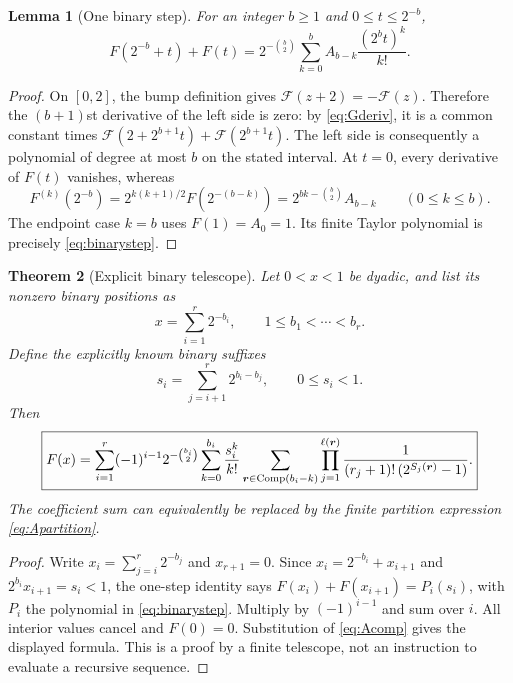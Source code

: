 \documentclass[11pt,oneside]{article}
\newtheorem{theorem}{Theorem}[section]
\newtheorem{lemma}[theorem]{Lemma}
\theoremstyle{definition}\newtheorem{definition}[theorem]{Definition}
\theoremstyle{remark}\newtheorem{remark}[theorem]{Remark}
\newcommand{\G}{\mathcal F}\newcommand{\eps}{\varepsilon}
\begin{document}
\begin{lemma}[One binary step]
\label{lem:binarystep}
For an integer $b\ge1$ and $0\le t\le2^{-b}$,
\begin{equation}
 F(2^{-b}+t)+F(t)
 =2^{-\binom b2}\sum_{k=0}^{b}A_{b-k}\frac{(2^bt)^k}{k!}.
 \label{eq:binarystep}
\end{equation}
\end{lemma}
\begin{proof}
On $[0,2]$, the bump definition gives $\G(z+2)=-\G(z)$. Therefore the
$(b+1)$st derivative of the left side is zero: by \eqref{eq:Gderiv}, it
is a common constant times
$\G(2+2^{b+1}t)+\G(2^{b+1}t)$. The left side is consequently a polynomial
of degree at most $b$ on the stated interval. At $t=0$, every derivative of
$F(t)$ vanishes, whereas
\[
 F^{(k)}(2^{-b})
 =2^{k(k+1)/2}F(2^{-(b-k)})
 =2^{bk-\binom b2}A_{b-k}\qquad(0\le k\le b).
\]
The endpoint case $k=b$ uses $F(1)=A_0=1$. Its finite Taylor polynomial
is precisely \eqref{eq:binarystep}.
\end{proof}

\begin{theorem}[Explicit binary telescope]
\label{thm:binary}
Let $0<x<1$ be dyadic, and list its nonzero binary positions as
\[
 x=\sum_{i=1}^{r}2^{-b_i},\qquad 1\le b_1<\cdots<b_r.
\]
Define the explicitly known binary suffixes
\begin{equation}
 s_i=\sum_{j=i+1}^{r}2^{b_i-b_j},\qquad 0\le s_i<1.
 \label{eq:bitsuffix}
\end{equation}
Then
\begin{equation}
 \boxed{\displaystyle
 F(x)=\sum_{i=1}^{r}(-1)^{i-1}2^{-\binom{b_i}{2}}
       \sum_{k=0}^{b_i}\frac{s_i^k}{k!}
       \sum_{\boldsymbol r\in\operatorname{Comp}(b_i-k)}
       \prod_{j=1}^{\ell(\boldsymbol r)}
       \frac{1}{(r_j+1)!\,(2^{S_j(\boldsymbol r)}-1)}.}
 \label{eq:binaryclosed}
\end{equation}
The coefficient sum can equivalently be replaced by the finite partition
expression \eqref{eq:Apartition}.
\end{theorem}
\begin{proof}
Write $x_i=\sum_{j=i}^r2^{-b_j}$ and $x_{r+1}=0$. Since
$x_i=2^{-b_i}+x_{i+1}$ and $2^{b_i}x_{i+1}=s_i<1$, the one-step identity
says $F(x_i)+F(x_{i+1})=P_i(s_i)$, with $P_i$ the polynomial in
\eqref{eq:binarystep}. Multiply by $(-1)^{i-1}$ and sum over $i$.
All interior values cancel and $F(0)=0$. Substitution of
\eqref{eq:Acomp} gives the displayed formula. This is a proof by a finite
telescope, not an instruction to evaluate a recursive sequence.
\end{proof}
\end{document}
